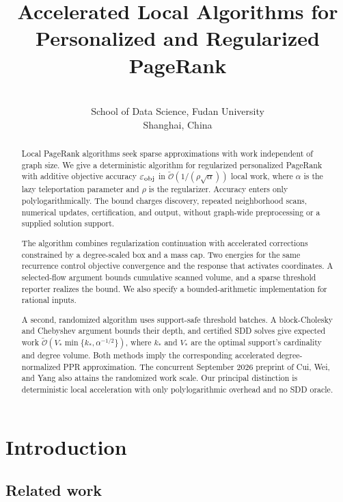 \documentclass[pmlr,11pt,twoside]{jmlr}
\title[Accelerated Local Algorithms for PageRank]{Accelerated Local Algorithms for\\Personalized and Regularized PageRank}
\author[Baojian Zhou]{%
  \Name{Baojian Zhou} \Email{\href{mailto:bjzhou@fudan.edu.cn}{bjzhou@fudan.edu.cn}}\\
  \addr School of Data Science, Fudan University\\
  Shanghai, China
}
\begin{document}
\maketitle
\thispagestyle{plain}

\begin{abstract}
Local PageRank algorithms seek sparse approximations with work independent
of graph size. We give a deterministic algorithm for regularized
personalized PageRank with additive objective accuracy $\varepsilon_{\mathrm{obj}}$ in
$\widetilde{\mathcal{O}}(1/(\rho\sqrt\alpha))$ local work, where $\alpha$
is the lazy teleportation parameter and $\rho$ is the regularizer.
Accuracy enters only polylogarithmically. The bound charges discovery,
repeated neighborhood scans, numerical updates, certification, and output,
without graph-wide preprocessing or a supplied solution support.

The algorithm combines regularization continuation with accelerated
corrections constrained by a degree-scaled box and a mass cap. Two energies
for the same recurrence control objective convergence and the response
that activates coordinates. A selected-flow argument bounds cumulative
scanned volume, and a sparse threshold reporter realizes the bound.
We also specify a bounded-arithmetic implementation for rational inputs.

A second, randomized algorithm uses support-safe threshold batches.
A block-Cholesky and Chebyshev argument bounds their depth, and certified
SDD solves give expected work
$\widetilde{\mathcal{O}}(V_*\min\{k_*,\alpha^{-1/2}\})$, where $k_*$
and $V_*$ are the optimal support's cardinality and degree volume.
Both methods imply the corresponding accelerated degree-normalized PPR
approximation. The concurrent September 2026 preprint of Cui, Wei, and
Yang also attains the randomized work scale. Our principal distinction
is deterministic local acceleration with only polylogarithmic overhead
and no SDD oracle.
\end{abstract}

\section{Introduction}\label{sec:introduction}


\subsection{Related work}\label{sec:related-work}

\end{document}

